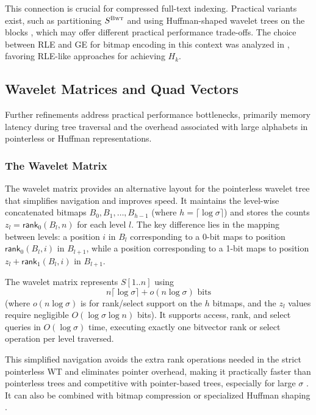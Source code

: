 This connection is crucial for compressed full-text indexing. Practical variants exist, such as partitioning $S^{\textsc{Bwt}}$ and using Huffman-shaped wavelet trees on the blocks \cite{karkkainen2011fixed}, which may offer different practical performance trade-offs. The choice between RLE and GE for bitmap encoding in this context was analyzed in \cite{TheMyriadVirtuesWT}, favoring RLE-like approaches for achieving $H_k$.

\subsection{Wavelet Matrices and Quad Vectors} \label{sec:wavelet_matrices_and_quad_vectors}

Further refinements address practical performance bottlenecks, primarily memory latency during tree traversal and the overhead associated with large alphabets in pointerless or Huffman representations.

\subsubsection{The Wavelet Matrix}
The wavelet matrix \cite{claude2015wavelet} provides an alternative layout for the pointerless wavelet tree that simplifies navigation and improves speed. It maintains the level-wise concatenated bitmaps $B_0, B_1, \dots, B_{h-1}$ (where $h = \lceil \log \sigma \rceil$) and stores the counts $z_l = \textsf{rank}_0(B_l, n)$ for each level $l$. The key difference lies in the mapping between levels: a position $i$ in $B_l$ corresponding to a 0-bit maps to position $\textsf{rank}_0(B_l, i)$ in $B_{l+1}$, while a position corresponding to a 1-bit maps to position $z_l + \textsf{rank}_1(B_l, i)$ in $B_{l+1}$.

\begin{theorem} \label{thm:wm_perf}
    The wavelet matrix represents $S[1..n]$ using
    \[ n \lceil \log \sigma \rceil + o(n \log \sigma) \text{ bits} \]
    (where $o(n \log \sigma)$ is for rank/select support on the $h$ bitmaps, and the $z_l$ values require negligible $O(\log \sigma \log n)$ bits). It supports \textsf{access}, \textsf{rank}, and \textsf{select} queries in $O(\log \sigma)$ time, executing exactly one bitvector rank or select operation per level traversed.
\end{theorem}

This simplified navigation avoids the extra rank operations needed in the strict pointerless WT and eliminates pointer overhead, making it practically faster than pointerless trees and competitive with pointer-based trees, especially for large $\sigma$ \cite{claude2015wavelet}. It can also be combined with bitmap compression or specialized Huffman shaping \cite{claude2015wavelet}.

